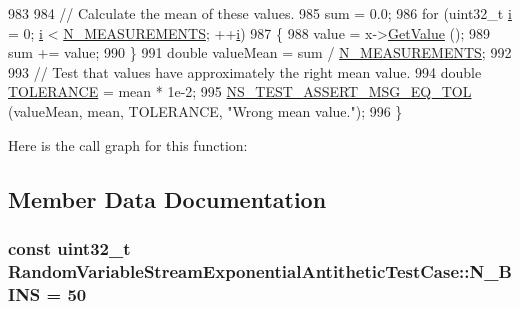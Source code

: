 \begin{DoxyCode}
983 
984   \textcolor{comment}{// Calculate the mean of these values.}
985   sum = 0.0;
986   \textcolor{keywordflow}{for} (uint32\_t \hyperlink{bernuolliDistribution_8m_a6f6ccfcf58b31cb6412107d9d5281426}{i} = 0; \hyperlink{bernuolliDistribution_8m_a6f6ccfcf58b31cb6412107d9d5281426}{i} < \hyperlink{classRandomVariableStreamExponentialAntitheticTestCase_a89d8b361cf56ca21687d35b0a7a89057}{N\_MEASUREMENTS}; ++\hyperlink{bernuolliDistribution_8m_a6f6ccfcf58b31cb6412107d9d5281426}{i})
987     \{
988       value = x->\hyperlink{classns3_1_1ExponentialRandomVariable_a5d7a50466c0b0f036ec0fc1aa478f2c3}{GetValue} ();
989       sum += value;
990     \}
991   \textcolor{keywordtype}{double} valueMean = sum / \hyperlink{classRandomVariableStreamExponentialAntitheticTestCase_a89d8b361cf56ca21687d35b0a7a89057}{N\_MEASUREMENTS};
992 
993   \textcolor{comment}{// Test that values have approximately the right mean value.}
994   \textcolor{keywordtype}{double} \hyperlink{spectrum-value-test_8cc_a30c17564229ec2e37dfea9c6c9ad643e}{TOLERANCE} = mean * 1e-2;
995   \hyperlink{group__testing_ga9e7861b56b4e70db3b56044cb7a28e41}{NS\_TEST\_ASSERT\_MSG\_EQ\_TOL} (valueMean, mean, TOLERANCE, \textcolor{stringliteral}{"Wrong mean value."}); 
996 \}
\end{DoxyCode}


Here is the call graph for this function\+:




\subsection{Member Data Documentation}
\subsubsection[{\texorpdfstring{N\+\_\+\+B\+I\+NS}{N_BINS}}]{\setlength{\rightskip}{0pt plus 5cm}const uint32\+\_\+t Random\+Variable\+Stream\+Exponential\+Antithetic\+Test\+Case\+::\+N\+\_\+\+B\+I\+NS = 50\hspace{0.3cm}{\ttfamily [static]}}\hypertarget{classRandomVariableStreamExponentialAntitheticTestCase_a7ffc40bce73013db87de6e45a5f1851e}{}\label{classRandomVariableStreamExponentialAntitheticTestCase_a7ffc40bce73013db87de6e45a5f1851e}
